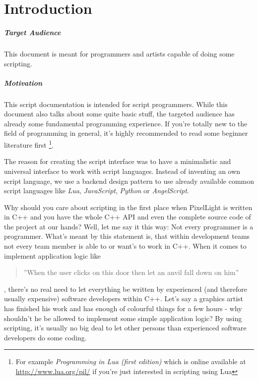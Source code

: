 \chapter{Introduction}


\paragraph{Target Audience}
This document is meant for programmers and artists capable of doing some scripting.


\paragraph{Motivation}
This script documentation is intended for script programmers. While this document also talks about some quite basic stuff, the targeted audience has already some fundamental programming experience. If you're totally new to the field of programming in general, it's highly recommended to read some beginner literature first \footnote{For example \emph{Programming in Lua (first edition)} which is online available at \url{http://www.lua.org/pil/} if you're just interested in scripting using Lua}.

The reason for creating the script interface was to have a minimalistic and universal interface to work with script languages. Instead of inventing an own script language, we use a backend design pattern to use already available common script languages like \emph{Lua}, \emph{JavaScript}, \emph{Python} or \emph{AngelScript}.

Why should you care about scripting in the first place when PixelLight is written in C++ and you have the whole C++ \ac{API} and even the complete source code of the project at our hands? Well, let me say it this way: Not every programmer is a programmer. What's meant by this statement is, that within development teams not every team member is able to or want's to work in C++. When it comes to implement application logic like \begin{quote}''When the user clicks on this door then let an anvil fall down on him''\end{quote}, there's no real need to let everything be written by experienced (and therefore usually expensive) software developers within C++. Let's say a graphics artist has finished his work and has enough of colourful things for a few hours - why shouldn't he be allowed to implement some simple application logic? By using scripting, it's usually no big deal to let other persons than experienced software developers do some coding.

